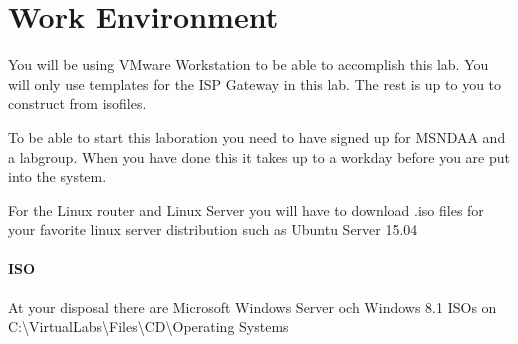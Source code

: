 \documentclass[paper=a4, fontsize=11pt]{report} %
\newcommand{\win}[1]{Microsoft Windows Server\ifthenelse{\isempty{#1}}{}{ #1}}
\begin{document}
\section{Work Environment}
\label{environment}

You will be using VMware Workstation to be able to accomplish this lab. You will only use templates for the ISP Gateway in this lab. The rest is up to you to construct from isofiles.
 
To be able to start this laboration you need to have signed up for MSNDAA and a labgroup. When you have done this it takes up to a workday before you are put into the system.

For the Linux router and Linux Server you will have to download .iso files for your favorite linux server distribution such as Ubuntu Server 15.04

\paragraph{ISO} At your disposal there are \win{2012 R2} och Windows 8.1 ISOs on 
C:\textbackslash VirtualLabs\textbackslash Files\textbackslash CD\textbackslash Operating Systems
\end{document}
